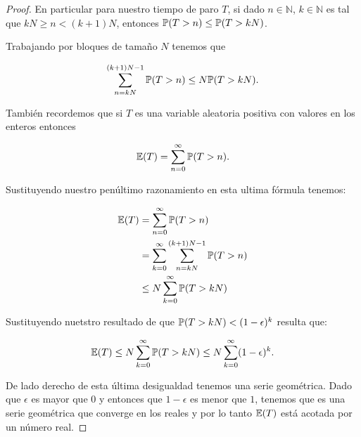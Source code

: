 \begin{proof}
	En particular para nuestro tiempo de paro $T$, si dado $n \in \mathbb{N}$, $k \in \mathbb{N}$ es tal que 
	$kN \geq n < (k+1)N$, entonces $\mathbb{P}(T > n) \leq \mathbb{P}(T > kN)$.\par\null

	Trabajando por bloques de tamaño $N$ tenemos que 
    
	\begin{align}
		\sum_{n = kN}^{(k+1)N -1} \mathbb{P}(T > n) \leq N \mathbb{P}(T > kN).
	\end{align}\par\null		
	
	También recordemos que si $T$ es una variable aleatoria positiva con valores en los enteros entonces 
	
    \begin{align}
		\mathbb{E}(T) = \sum_{n=0}^{\infty} \mathbb{P}(T > n).
	\end{align}\par\null
	
	Sustituyendo nuestro penúltimo razonamiento en esta ultima fórmula tenemos:
	
	\begin{align}
		\mathbb{E}(T) 	&= 		\sum_{n=0}^{\infty} \mathbb{P}(T > n) \\
				&= 		\sum_{k=0}^{\infty} \sum_{n = kN}^{(k+1)N -1} \mathbb{P}(T > n) \\
				&\leq 	N \sum_{k=0}^{\infty} \mathbb{P}(T > kN)
	\end{align}\par\null
		
	Sustituyendo nuetstro resultado de que $\mathbb{P}(T>kN)<(1-\epsilon)^{k}$ resulta que:
    
	\begin{align}
		\mathbb{E}(T)\leq N \sum_{k=0}^{\infty} \mathbb{P}(T > kN) \leq N \sum_{k=0}^{\infty} (1-\epsilon)^k.
	\end{align}\par\null
	
	De lado derecho de esta última desigualdad tenemos una serie geométrica. Dado que $\epsilon$ es mayor 
	que $0$ y entonces que $1-\epsilon$ es menor que $1$, tenemos que es una serie geométrica que converge 
	en los reales y por lo tanto $\mathbb{E}(T)$ está acotada por un número real.
\end{proof}	